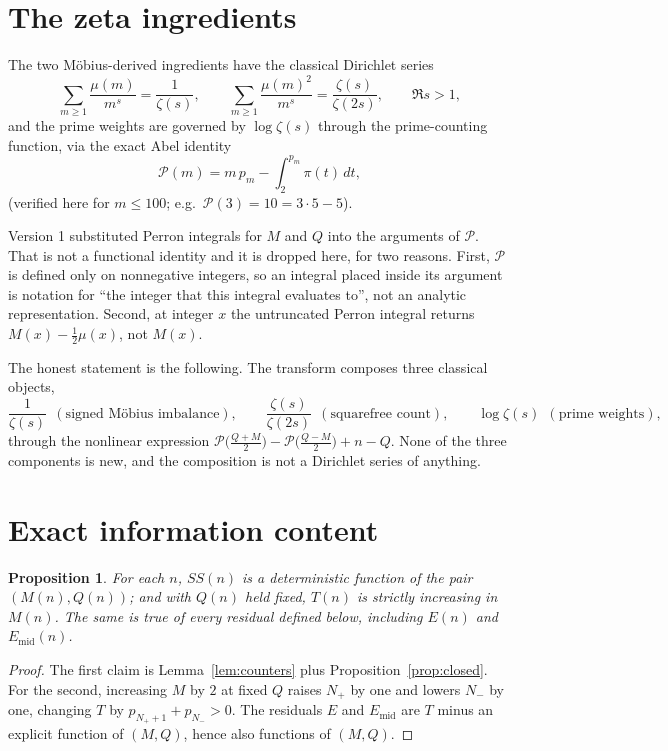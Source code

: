 \documentclass[11pt]{amsart}
\newtheorem{proposition}[theorem]{Proposition}
\theoremstyle{definition}
\newcommand{\mob}{\mu}
\newcommand{\Mert}{M}
\newcommand{\Sq}{Q}
\newcommand{\PS}{\mathcal P}
\begin{document}
\section{The zeta ingredients}

The two M\"obius-derived ingredients have the classical Dirichlet series
\[
\sum_{m\ge1}\frac{\mob(m)}{m^s}=\frac1{\zeta(s)},
\qquad
\sum_{m\ge1}\frac{\mob(m)^2}{m^s}=\frac{\zeta(s)}{\zeta(2s)},
\qquad \Re s>1,
\]
and the prime weights are governed by $\log\zeta(s)$ through the prime-counting
function, via the exact Abel identity
\[
\PS(m)=m\,p_m-\int_2^{p_m}\pi(t)\,dt ,
\]
(verified here for $m\le100$; e.g.\ $\PS(3)=10=3\cdot5-5$).

Version 1 substituted Perron integrals for $\Mert$ and $\Sq$ into the arguments
of $\PS$. That is not a functional identity and it is dropped here, for two
reasons. First, $\PS$ is defined only on nonnegative integers, so an integral
placed inside its argument is notation for ``the integer that this integral
evaluates to'', not an analytic representation. Second, at integer $x$ the
untruncated Perron integral returns $\Mert(x)-\tfrac12\mob(x)$, not $\Mert(x)$.

The honest statement is the following. The transform composes three classical
objects,
\[
\frac1{\zeta(s)}\ \ (\text{signed M\"obius imbalance}),
\qquad
\frac{\zeta(s)}{\zeta(2s)}\ \ (\text{squarefree count}),
\qquad
\log\zeta(s)\ \ (\text{prime weights}),
\]
through the nonlinear expression
$\PS\bigl(\tfrac{\Sq+\Mert}2\bigr)-\PS\bigl(\tfrac{\Sq-\Mert}2\bigr)+n-\Sq$.
None of the three components is new, and the composition is not a Dirichlet
series of anything.

\section{Exact information content}

\begin{proposition}\label{prop:info}
For each $n$, $SS(n)$ is a deterministic function of the pair
$(\Mert(n),\Sq(n))$; and with $\Sq(n)$ held fixed, $T(n)$ is strictly
increasing in $\Mert(n)$. The same is true of every residual defined below,
including $E(n)$ and $E_{\mathrm{mid}}(n)$.
\end{proposition}

\begin{proof}
The first claim is Lemma~\ref{lem:counters} plus
Proposition~\ref{prop:closed}. For the second, increasing $\Mert$ by $2$ at
fixed $\Sq$ raises $N_+$ by one and lowers $N_-$ by one, changing $T$ by
$p_{N_++1}+p_{N_-}>0$. The residuals $E$ and $E_{\mathrm{mid}}$ are $T$ minus an
explicit function of $(\Mert,\Sq)$, hence also functions of $(\Mert,\Sq)$.
\end{proof}
\end{document}
